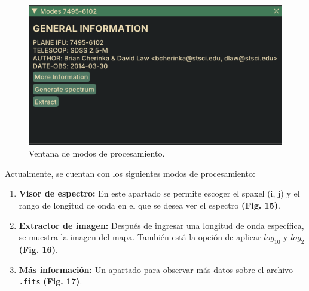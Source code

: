 \documentclass[10pt,twocolumn,a4paper]{opticajnl}
\begin{document}
\begin{figure}
    \centering
    \includegraphics[width=1\linewidth]{modes.png}
    \caption{Ventana de modos de procesamiento.}
    \label{fig:modes}
\end{figure}

Actualmente, se cuentan con los siguientes modos de procesamiento:

\begin{enumerate}
\item \textbf{Visor de espectro:} En este apartado se permite escoger el spaxel (i, j) y el rango de longitud de onda en el que se desea ver el espectro \textbf{(Fig. 15)}.
\item \textbf{Extractor de imagen:} Después de ingresar una longitud de onda específica, se muestra la imagen del mapa. También está la opción de aplicar $log_{10}$ y $log_{2}$ \textbf{(Fig. 16)}.
\item \textbf{Más información:} Un apartado para observar más datos sobre el archivo \verb|.fits| \textbf{(Fig. 17)}.
\end{enumerate}
\end{document}
